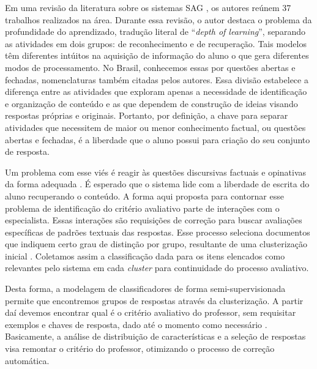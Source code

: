 Em uma revisão da literatura sobre os sistemas SAG \cite{burrows2015}, os autores reúnem 37 trabalhos realizados na área. Durante essa revisão, o autor destaca o problema da  profundidade do aprendizado, tradução literal de ``\textit{depth of learning}'', separando as atividades em dois grupos: de reconhecimento e de recuperação. Tais modelos têm diferentes intúitos na aquisição de informação do aluno o que gera diferentes modos de processamento. No Brasil, conhecemos essas por questões abertas e fechadas, nomenclaturas também citadas pelos autores. Essa divisão estabelece a diferença entre as atividades que exploram apenas a necessidade de identificação e organização de conteúdo e as que dependem de construção de ideias visando respostas próprias e originais. Portanto, por definição, a chave para separar atividades que necessitem de maior ou menor conhecimento factual, ou questões abertas e fechadas, é a liberdade que o aluno possui para criação do seu conjunto de resposta.

Um problema com esse viés é reagir às questões discursivas factuais e opinativas da forma adequada \cite{bailey2008}. É esperado que o sistema lide com a liberdade de escrita do aluno recuperando o conteúdo. A forma aqui proposta para contornar esse problema de identificação do critério avaliativo parte de interações com o especialista. Essas interações são requisições de correção para buscar avaliações específicas de padrões textuais das respostas. Esse processo seleciona documentos que indiquem certo grau de distinção por grupo, resultante de uma clusterização inicial \cite{oliveira2014}. Coletamos assim a classificação dada para os itens elencados como relevantes pelo sistema em cada \textit{cluster} para continuidade do processo avaliativo.

Desta forma, a modelagem de classificadores de forma semi-supervisionada permite que encontremos grupos de respostas através da clusterização. A partir daí devemos encontrar qual é o critério avaliativo do professor, sem requisitar exemplos e chaves de resposta, dado até o momento como necessário \cite{butcher2010, mohler2011, ramachandran2015a}. Basicamente, a análise de distribuição de características e a seleção de respostas visa remontar o critério do professor, otimizando o processo de correção automática.

